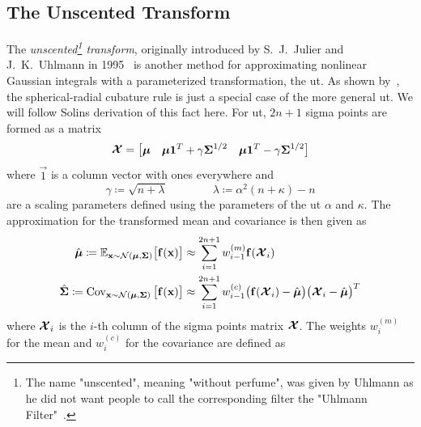 	\subsection{The Unscented Transform}
		The \emph{unscented\footnote{The name "unscented", meaning "without perfume", was given by Uhlmann as he did not want people to call the corresponding filter the "Uhlmann Filter"~\cite{FirstHandUnscentedTransform}.} transform}, originally introduced by S.~J.~Julier and J.~K.~Uhlmann in 1995~\cite{julierNewApproachFiltering1995} is another method for approximating nonlinear Gaussian integrals with a parameterized transformation, the \ac{ut}. As shown by~\cite{solinCubatureIntegrationMethods2010}, the spherical-radial cubature rule is just a special case of the more general \ac{ut}. We will follow Solins derivation of this fact here. For \ac{ut}, \( 2n + 1 \) sigma points are formed as a matrix
		\begin{equation}
			\boldsymbol{\mathrm{\mathcal{X}}} =
				\begin{bmatrix}
					\boldsymbol{\mathrm{\mu}} & \boldsymbol{\mathrm{\mu}} \boldsymbol{\mathrm{1}}^T + \gamma \boldsymbol{\mathrm{\Sigma}}^{1/2} & \boldsymbol{\mathrm{\mu}} \boldsymbol{\mathrm{1}}^T - \gamma \boldsymbol{\mathrm{\Sigma}}^{1/2}
				\end{bmatrix}  \label{eqn:utSigmaPoints}
		\end{equation}
		where \( \vec{1} \) is a column vector with ones everywhere and
		\begin{equation*}
			\gamma \coloneqq \sqrt{n + \lambda} \qquad\qquad \lambda \coloneqq \alpha^2 (n + \kappa) - n
		\end{equation*}
		are a scaling parameters defined using the parameters of the \ac{ut} \( \alpha \) and \( \kappa \). The approximation for the transformed mean and covariance is then given as
		\begin{align}
			\hat{\boldsymbol{\mathrm{\mu}}} \coloneqq \mathbb{E}_{\boldsymbol{\mathrm{x}} \sim \mathcal{N}(\boldsymbol{\mathrm{\mu}}, \boldsymbol{\mathrm{\Sigma}})}\big[ \boldsymbol{\mathrm{f}}(\boldsymbol{\mathrm{x}}) \big] &\approx \sum_{i = 1}^{2n + 1} w_{i - 1}^{(m)} \boldsymbol{\mathrm{f}}(\boldsymbol{\mathrm{\mathcal{X}}}_i)  \label{eqn:utMean} \\
			\hat{\boldsymbol{\mathrm{\Sigma}}} \coloneqq \operatorname{Cov}_{\boldsymbol{\mathrm{x}} \sim \mathcal{N}(\boldsymbol{\mathrm{\mu}}, \boldsymbol{\mathrm{\Sigma}})}\big[ \boldsymbol{\mathrm{f}}(\boldsymbol{\mathrm{x}}) \big] &\approx \sum_{i = 1}^{2n + 1} w_{i - 1}^{(c)} \big( \boldsymbol{\mathrm{f}}(\boldsymbol{\mathrm{\mathcal{X}}}_i) - \hat{\boldsymbol{\mathrm{\mu}}} \big) \big( \boldsymbol{\mathrm{\mathcal{X}}}_i - \hat{\boldsymbol{\mathrm{\mu}}} \big)^T  \label{eqn:utCov}
		\end{align}
		where \( \boldsymbol{\mathrm{\mathcal{X}}}_i \) is the \(i\)-th column of the sigma points matrix \( \boldsymbol{\mathrm{\mathcal{X}}} \). The weights \( w_i^{(m)} \) for the mean and \( w_i^{(c)} \) for the covariance are defined as
